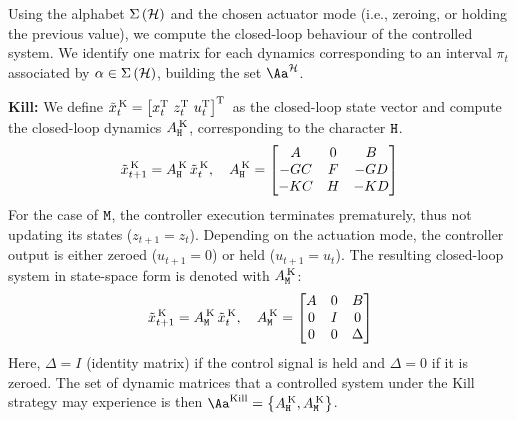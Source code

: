 Using the alphabet $\Sigma\left(\mathcal{H}\right)$ and the chosen actuator mode (i.e., zeroing, or holding the previous value), we compute the closed-loop behaviour of the controlled system.
We identify one matrix for each dynamics corresponding to an interval $\pi_t$ associated by $\alpha \in \Sigma\left( \mathcal{H} \right)$, building the set $\Aa^\strat$.

\textbf{Kill: }%
%
We define $\tilde x_t^{\,\text{K}} = \left[ x_t^{\mathrm{\small{T}}}{}\,\, z_t^{\mathrm{\small{T}}}{}\,\, u_t^{\mathrm{\small{T}}}{} \right]^{\mathrm{\small{T}}}{}$ as the closed-loop state vector and compute the closed-loop dynamics $A^{\,\text{K}}_{\texttt{H}}$, corresponding to the character $\texttt{H}$.
\begin{equation*}
    \tilde x_{t+1}^{\,\text{K}} = A^{\,\text{K}}_{\texttt{H}}\,\tilde x_t^{\,\text{K}}, \quad
    A^{\,\text{K}}_{\texttt{H}} = \begin{bmatrix}
        A       & 0    & B       \\
        -GC   & F  & -GD   \\
        -KC   & H  & -KD   \\
    \end{bmatrix}
\end{equation*}
%
For the case of $\texttt{M}$, the controller execution terminates prematurely, thus not updating its states ($z_{t+1} = z_t$).
Depending on the actuation mode, the controller output is either zeroed ($u_{t+1} = 0$) or held ($u_{t+1} = u_t$).
The resulting closed-loop system in state-space form is denoted with $A^{\,\text{K}}_{\texttt{M}}$:
\begin{equation*}
    \tilde x_{t+1}^{\,\text{K}} = A^{\,\text{K}}_{\texttt{M}}\,\tilde x_t^{\,\text{K}}, \quad
    A^{\,\text{K}}_{\texttt{M}} = \begin{bmatrix}
        A & 0  & B \\
        0   & I  & 0   \\
        0   & 0  & \Delta
    \end{bmatrix}
\end{equation*}
Here, $\Delta = I$ (identity matrix) if the control signal is held and $\Delta = 0$ if it is zeroed.
The set of dynamic matrices that a controlled system under the Kill strategy may experience is then $\Aa^{\text{Kill}}=\left\{A^{\,\text{K}}_{\cH},A^{\,\text{K}}_{\cM}\right\}$.

